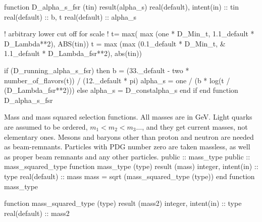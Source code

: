   function D_alpha_s_fsr (tin) result(alpha_s)
    real(default), intent(in) :: tin
    real(default) :: b, t
    real(default) :: alpha_s

!    arbitrary lower cut off for scale
!    t= max( max (one * D_Min_t, 1.1_default * D_Lambda**2), ABS(tin))
    t = max (max (0.1_default * D_Min_t, &
         1.1_default * D_Lambda_fsr**2), abs(tin))

    if (D_running_alpha_s_fsr) then
       b = (33._default - two * number_of_flavors(t)) / (12._default * pi)
       alpha_s = one / (b * log(t / (D_Lambda_fsr**2)))
    else
       alpha_s = D_constalpha_s
    end if
  end function D_alpha_s_fsr

\eatline
\nwendcode{}Mass and mass squared selection functions. All masses are in
GeV. Light quarks are assumed to be ordered, $m_1 < m_2 < m_3 \ldots$,
and they get current masses, not elementary ones. Mesons and baryons
other than proton and neutron are needed as beam-remnants. Particles
with PDG number zero are taken massless, as well as proper beam
remnants and any other particles.
\nwenddocs{}\plusendmoddef
  public :: mass_type
  public :: mass_squared_type
\nwendcode{}\plusendmoddef
  function mass_type (type) result (mass)
    integer, intent(in) :: type
    real(default) :: mass
    mass = sqrt (mass_squared_type (type))
  end function mass_type

  function mass_squared_type (type) result (mass2)
    integer, intent(in) :: type
    real(default) :: mass2

